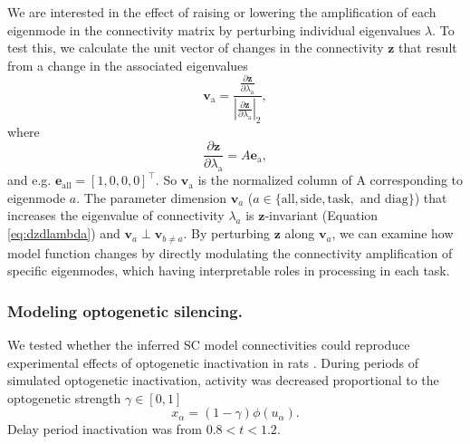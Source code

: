 \documentclass[11pt]{article}
\begin{document}
We are interested in the effect of raising or lowering the amplification of each eigenmode in the connectivity matrix by perturbing individual eigenvalues $\lambda$.
To test this, we calculate the unit vector of changes in the connectivity $\mathbf{z}$ that result from a change in the associated eigenvalues
\begin{equation}
\mathbf{v}_{\text{a}} = \frac{\frac{\partial \mathbf{z}}{\partial \lambda_{\text{a}}}}{|\frac{\partial \mathbf{z}}{\partial \lambda_{\text{a}}}|_2},
\end{equation}
where
\begin{equation} \label{eq:dzdlambda}
\frac{\partial \mathbf{z}}{\partial \lambda_{\text{a}}} = A\mathbf{e}_{\text{a}},
\end{equation}
and e.g. $\mathbf{e}_{\text{all}} = [1, 0, 0, 0]^\top$.
So $\mathbf{v}_{\text{a}}$ is the normalized column of A corresponding to eigenmode $a$.
The parameter dimension $\mathbf{v}_a$ ($a \in \{\text{all}, \text{side}, \text{task}, \text{ and diag}\}$) that increases the eigenvalue of connectivity $\lambda_a$ is $\mathbf{z}$-invariant (Equation \ref{eq:dzdlambda}) and $\mathbf{v}_a \perp \mathbf{v}_{b \neq a}$.
By perturbing $\mathbf{z}$ along $\mathbf{v}_a$, we can examine how model function changes by directly modulating the connectivity amplification of specific eigenmodes, which having interpretable roles in processing in each task.

%

\subsubsection{Modeling optogenetic silencing.} \label{methods_sc_opto}
We tested whether the inferred SC model connectivities could reproduce experimental effects of optogenetic inactivation in rats \cite{duan2019collicular}.
During periods of simulated optogenetic inactivation, activity was decreased proportional to the optogenetic strength $\gamma \in [0, 1]$
\begin{equation}
x_\alpha = (1-\gamma)\phi(u_\alpha).
\end{equation}
Delay period inactivation was from $0.8 < t < 1.2$.
\end{document}
